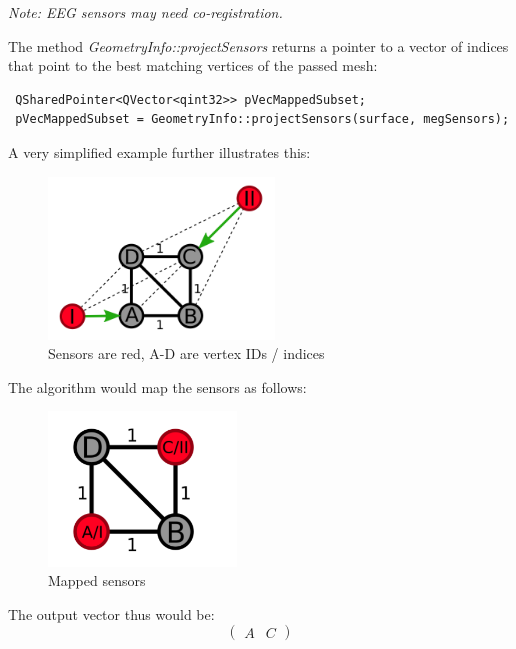 \begin{center}
\textit{Note: EEG sensors may need co-registration.}
\end{center}

The method \textit{GeometryInfo::projectSensors} returns a pointer to a vector of indices that point to the best matching vertices of the passed mesh:
\begin{lstlisting}
 QSharedPointer<QVector<qint32>> pVecMappedSubset;
 pVecMappedSubset = GeometryInfo::projectSensors(surface, megSensors);
\end{lstlisting}

A very simplified example further illustrates this:

\begin{figure}[h]
	\begin{center}
		\includegraphics[width=6cm]{figures/sensorMappingSimpleBefore.png}
		\caption{Sensors are red, A-D are vertex IDs / indices}
	\end{center}
\end{figure}

\clearpage

The algorithm would map the sensors as follows:

\begin{figure}[h]
	\begin{center}
		\includegraphics[width=5cm]{figures/sensorMappingSimpleAfter.png}
		\caption{Mapped sensors}
	\end{center}
\end{figure}

The output vector thus would be:
\[
\begin{pmatrix} A & C \end{pmatrix}
\]

